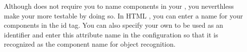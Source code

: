 
Although \app{} does not require you to name components in your \gdaut{}, you neverthless make your \gdaut{} more testable by doing so. In HTML \gdauts{}, you can enter a name for your components in the id tag.  You can also specify your own  to be used as an identifier and enter this attribute name in the \gdaut{} configuration  so that it is recognized as the component name for object recognition. 

